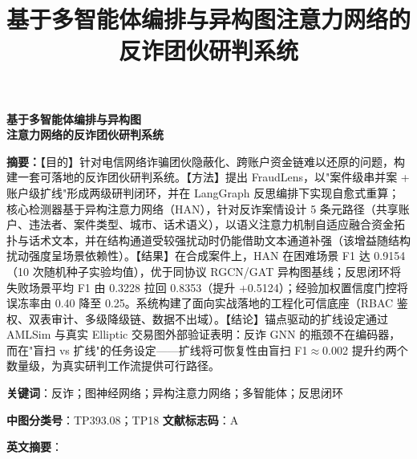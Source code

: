 \documentclass[12pt,a4paper]{ctexart}
\title{基于多智能体编排与异构图注意力网络的反诈团伙研判系统}
\date{}
\begin{document}
\vspace*{-1.6cm}
\begin{center}
  \bfseries\Large 基于多智能体编排与异构图\\[2pt]
  注意力网络的反诈团伙研判系统\\[4pt]
\end{center}
\vspace{4pt}

\noindent\textbf{摘要：}【目的】针对电信网络诈骗团伙隐蔽化、跨账户资金链难以还原的问题，构建一套可落地的反诈团伙研判系统。【方法】提出 FraudLens，以"案件级串并案 + 账户级扩线"形成两级研判闭环，并在 LangGraph 反思编排下实现自愈式重算；核心检测器基于异构注意力网络（HAN），针对反诈案情设计 5 条元路径（共享账户、违法者、案件类型、城市、话术语义），以语义注意力机制自适应融合资金拓扑与话术文本，并在结构通道受较强扰动时仍能借助文本通道补强（该增益随结构扰动强度呈场景依赖性）。【结果】在合成案件上，HAN 在困难场景 F1 达 0.9154（10 次随机种子实验均值），优于同协议 RGCN/GAT 异构图基线；反思闭环将失败场景平均 F1 由 0.3228 拉回 0.8353（提升 +0.5124）；经验加权置信度门控将误冻率由 0.40 降至 0.25。系统构建了面向实战落地的工程化可信底座（RBAC 鉴权、双表审计、多级降级链、数据不出域）。【结论】锚点驱动的扩线设定通过 AMLSim 与真实 Elliptic 交易图外部验证表明：反诈 GNN 的瓶颈不在编码器，而在"盲扫 vs 扩线"的任务设定——扩线将可恢复性由盲扫 F1$\approx$0.002 提升约两个数量级，为真实研判工作流提供可行路径。

\vspace{2pt}

\noindent\textbf{关键词}：反诈；图神经网络；异构注意力网络；多智能体；反思闭环

\noindent\textbf{中图分类号}：TP393.08；TP18 \qquad \textbf{文献标志码}：A

\noindent\textbf{英文摘要}：
\end{document}

